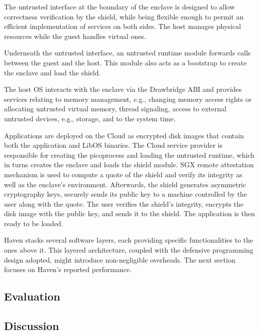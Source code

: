 The untrusted interface at the boundary of the enclave is designed to allow correctness verification by the shield, while being flexible enough to permit an efficient implementation of services on both sides.
The host manages physical resources while the guest handles virtual ones.

Underneath the untrusted interface, an untrusted runtime module forwards calls between the guest and the host.
This module also acts as a bootstrap to create the enclave and load the shield.

The host OS interacts with the enclave via the Drawbridge ABI and provides services relating to memory management, e.g., changing memory access rights or allocating untrusted virtual memory, thread signaling, access to external untrusted devices, e.g., storage, and to the system time.

Applications are deployed on the Cloud as encrypted disk images that contain both the application and LibOS binaries.
The Cloud service provider is responsible for creating the picoprocess and loading the untrusted runtime, which in turns creates the enclave and loads the shield module.
SGX remote attestation mechanism is used to compute a quote of the shield and verify its integrity as well as the enclave's environment.
Afterwards, the shield generates asymmetric cryptography keys, securely sends its public key to a machine controlled by the user along with the quote.
The user verifies the shield's integrity, encrypts the disk image with the public key, and sends it to the shield.
The application is then ready to be loaded.

Haven stacks several software layers, each providing specific functionalities to the ones above it.
This layered architecture, coupled with the defensive programming design adopted, might introduce non-negligible overheads.
The next section focuses on Haven's reported performance.


\subsection{Evaluation}



\subsection{Discussion}






